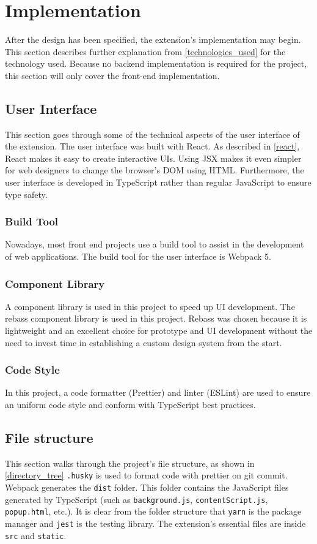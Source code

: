 \newpage
\chapter{Implementation}
After the design has been specified, the extension's implementation may begin. This section describes further explanation from \autoref{technologies_used} for the technology used. Because no backend implementation is required for the project, this section will only cover the front-end implementation.

\section{User Interface}
This section goes through some of the technical aspects of the user interface of the extension. The user interface was built with React. As described in \autoref{react}, React makes it easy to create interactive UIs. Using JSX makes it even simpler for web designers to change the browser's DOM using HTML. Furthermore, the user interface is developed in TypeScript rather than regular JavaScript to ensure type safety.

\subsection{Build Tool}
Nowadays, most front end projects use a build tool to assist in the development of web applications. The build tool for the user interface is Webpack 5.

\subsection{Component Library}
A component library is used in this project to speed up UI development. The rebass component library is used in this project. Rebass was chosen because it is lightweight and an excellent choice for prototype and UI development without the need to invest time in establishing a custom design system from the start.

\subsection{Code Style}
In this project, a code formatter (Prettier) and linter (ESLint) are used to ensure an uniform code style and conform with TypeScript best practices.

\section{File structure}
This section walks through the project's file structure, as shown in \autoref{directory_tree} \texttt{.husky} is used to format code with prettier on git commit. Webpack generates the \texttt{dist} folder. This folder contains the JavaScript files generated by TypeScript (such as \texttt{background.js}, \texttt{contentScript.js}, \texttt{popup.html}, etc.). It is clear from the folder structure that \texttt{yarn} is the package manager and \texttt{jest} is the testing library. The extension's essential files are inside \texttt{src} and \texttt{static}.

